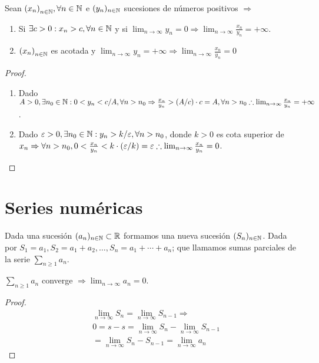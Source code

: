 \begin{prop}
  Sean \({(x_n)}_{n \in \mathbb{N}}, \forall n \in \mathbb{N} \) e \((y_n)_{n \in \mathbb{N}} \) sucesiones de números positivos \(\Rightarrow \) \begin{enumerate}
    \item Si \(\exists c > 0 : x_n > c, \forall n \in \mathbb{N} \) y si \(\lim_{n \to \infty} y_n = 0 \Rightarrow \lim_{n \to \infty} \frac{x_n}{y_n} = +\infty\).
    \item \({(x_n)}_{n \in \mathbb{N}} \) es acotada y \(\lim_{n \to \infty} y_n = +\infty \Rightarrow \lim_{n \to \infty} \frac{x_n}{y_n} = 0\)
  \end{enumerate}
  \begin{proof}
    \begin{enumerate}
      \item Dado \(A > 0, \exists n_0 \in \mathbb{N} : 0 < y_n < c/A, \forall n > n_0 \Rightarrow \frac{x_n}{y_n} > (A/c) \cdot c = A, \forall n > n_0 \therefore \lim_{n \to \infty} \frac{x_n}{y_n} = + \infty\).
      \item Dado \(\varepsilon > 0, \exists n_0 \in \mathbb{N} : y_n > k/\varepsilon, \forall n > n_0\), donde \(k > 0\) es cota superior de \(x_n \Rightarrow \forall n > n_0, 0 < \frac{x_n}{y_n} < k \cdot (\varepsilon/k) = \varepsilon \therefore \lim_{n \to \infty} \frac{x_n}{y_n} = 0\).
    \end{enumerate}
  \end{proof}
\end{prop}

\section{Series numéricas}

Dada una sucesión \((a_n)_{n \in \mathbb{N}} \subset \mathbb{R} \) formamos una nueva sucesión \((S_n)_{n \in \mathbb{N}} \). Dada por \(S_1 = a_1, S_2 = a_1 + a_2, \ldots, S_n = a_1 + \cdots + a_n\); que llamamos sumas parciales de la serie \(\sum_{n \geq 1} a_n\).

\begin{theorem}
  \(\sum_{n \geq 1} a_n\) converge \(\Rightarrow \lim_{n \to \infty} a_n = 0\).
  \begin{proof}
    \begin{align*}
       & \lim_{n \to \infty} S_n = \lim_{n \to \infty} S_{n-1} \Rightarrow \\
       & 0 = s - s = \lim_{n \to \infty} S_n - \lim_{n \to \infty} S_{n-1} \\
       & = \lim_{n \to \infty} S_n - S_{n-1} = \lim_{n \to \infty} a_n
    \end{align*}
  \end{proof}
\end{theorem}

